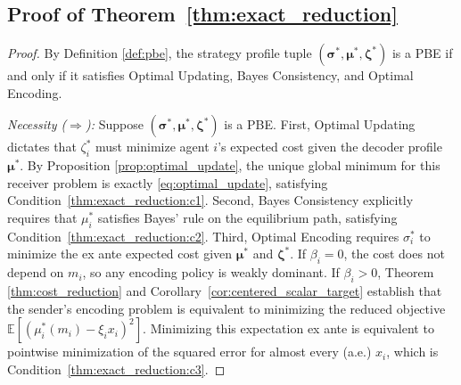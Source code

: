 \documentclass[journal,twoside,web]{ieeecolor}
\begin{document}
\subsection{Proof of Theorem~\ref{thm:exact_reduction}}
\label{app:proof_exact_reduction}
\begin{proof}
    By Definition \ref{def:pbe}, the strategy profile tuple $(\bm{\sigma}^*, \bm{\mu}^*, \bm{\zeta}^*)$ is a PBE if and only if it satisfies Optimal Updating, Bayes Consistency, and Optimal Encoding.

    \emph{Necessity ($\Rightarrow$):} Suppose $(\bm{\sigma}^*, \bm{\mu}^*, \bm{\zeta}^*)$ is a PBE.
    First, Optimal Updating dictates that $\zeta_i^*$ must minimize agent $i$'s expected cost given the decoder profile $\bm{\mu}^*$. By Proposition \ref{prop:optimal_update}, the unique global minimum for this receiver problem is exactly \eqref{eq:optimal_update}, satisfying Condition~\ref{thm:exact_reduction:c1}.
    Second, Bayes Consistency explicitly requires that $\mu_i^*$ satisfies Bayes' rule on the equilibrium path, satisfying Condition~\ref{thm:exact_reduction:c2}.
    Third, Optimal Encoding requires $\sigma_i^*$ to minimize the ex ante expected cost given $\bm{\mu}^*$ and $\bm{\zeta}^*$. If $\beta_i = 0$, the cost does not depend on $m_i$, so any encoding policy is weakly dominant. If $\beta_i > 0$, Theorem \ref{thm:cost_reduction} and Corollary~\ref{cor:centered_scalar_target} establish that the sender's encoding problem is equivalent to minimizing the reduced objective $\mathbb{E}[(\mu_i^*(m_i) - \xi_i x_i)^2]$. Minimizing this expectation ex ante is equivalent to pointwise minimization of the squared error for almost every (a.e.) $x_i$, which is Condition~\ref{thm:exact_reduction:c3}.


\end{proof}
\end{document}
